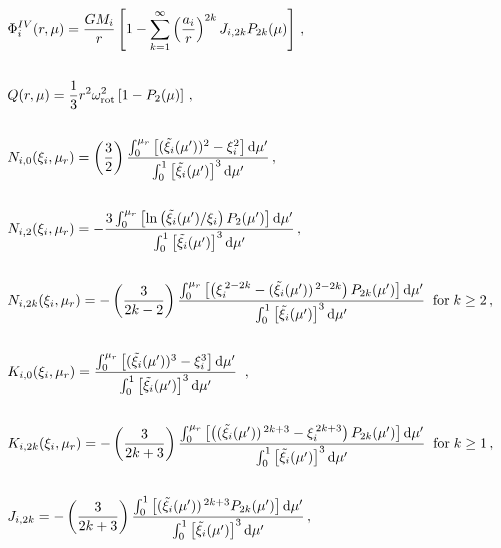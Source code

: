 \documentclass[11pt, oneside]{article}   	%
\begin{document}
\begin{align}
& \begin{aligned}
\Phi^{IV}_i(r,\mu) {} &= \frac{G M_i}{r} \left [ 1-\sum_{k=1}^{\infty} \left ( \frac{a_i}{r} \right )^{2k} J_{i,2k} P_{2k}(\mu) \right ] \,,
\end{aligned} \\[4ex]
%
& \begin{aligned}
Q (r,\mu) =\frac{1}{3} r^2 \omega_{\rm rot}^2 \left [ 1 - P_2(\mu) \right ] \,,
\end{aligned} \\[4ex]
%
& \begin{aligned}
\label{HUG:eqn:Ni0}
N_{i,0}(\xi_i,\mu_r)  {} & = \left (  \frac{3}{2} \right ) \frac{ \int_{0}^{\mu_r} \left [ (\tilde{\xi_i}(\mu'))^2 - \xi_i^2 \right ] {\rm d}\mu' }{\int_{0}^{1} \left [ \tilde{\xi_i}(\mu') \right ]^3 {\rm d}\mu' } \,,
\end{aligned} \\[4ex]
%
& \begin{aligned}
\label{HUG:eqn:Ni2}
N_{i,2}(\xi_i,\mu_r) {} &= - \frac{ 3 \int_{0}^{\mu_r} \left [ \ln \left ( \tilde{\xi_i}(\mu') / \xi_i \right ) P_2(\mu') \right ] {\rm d}\mu' }{\int_{0}^{1} \left [ \tilde{\xi_i}(\mu') \right ]^3 {\rm d}\mu' } \,,
\end{aligned} \\[4ex]
%
& \begin{aligned}
\label{HUG:eqn:Ni2k}
N_{i,2k}(\xi_i,\mu_r) {} &=  -\left ( \frac{3}{2k-2} \right ) \frac{ \int_{0}^{\mu_r} \left [ \left ( \xi_i^{\, 2-2k} - (\tilde{\xi_i}(\mu'))^{\, 2-2k} \right ) P_{2k}(\mu') \right ] {\rm d}\mu' }{\int_{0}^{1} \left [ \tilde{\xi_i}(\mu') \right ]^3 {\rm d}\mu' } \;\; \textrm{for} \; k \ge 2 \,,
\end{aligned} \\[4ex]
%
& \begin{aligned}
\label{HUG:eqn:Ki0}
K_{i,0}(\xi_i,\mu_r)  {} &=  \frac{ \int_{0}^{\mu_r} \left [ (\tilde{\xi_i}(\mu'))^3 - \xi_i^3 \right ] {\rm d}\mu' }{\int_{0}^{1} \left [ \tilde{\xi_i}(\mu') \right ]^3 {\rm d}\mu' } \;\;,
\end{aligned} \\[4ex]
%
& \begin{aligned}
\label{HUG:eqn:Ki2k}
K_{i,2k}(\xi_i,\mu_r) {} &=  - \left ( \frac{3}{2k+3} \right ) \frac{ \int_{0}^{\mu_r} \left [ \left ( (\tilde{\xi_i}(\mu'))^{\, 2k+3} - \xi_i^{\, 2k+3} \right ) P_{2k}(\mu') \right ] {\rm d}\mu' }{\int_{0}^{1} \left [ \tilde{\xi_i}(\mu') \right ]^3 {\rm d}\mu' } \; \; \textrm{for} \; k \ge 1 \,,
\end{aligned} \\[4ex]
%
& \begin{aligned}
\label{HUG:eqn:Ji2k}
J_{i,2k}  {} &=  - \left ( \frac{3}{2k+3} \right ) \frac{ \int_{0}^{1} \left [ (\tilde{\xi_i}(\mu'))^{\, 2k+3}  P_{2k}(\mu') \right ] {\rm d}\mu' }{\int_{0}^{1} \left [ \tilde{\xi_i}(\mu') \right ]^3 {\rm d}\mu' } \,,
\end{aligned}
\end{align}
\end{document}

